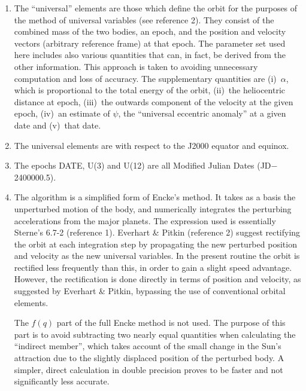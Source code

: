\documentclass[11pt,twoside]{article}
\begin{document}
{
 \begin{enumerate}
  \setlength{\parskip}{\medskipamount}
  \item The ``universal'' elements are those which define the orbit for the
        purposes of the method of universal variables (see reference 2).
        They consist of the combined mass of the two bodies, an epoch,
        and the position and velocity vectors (arbitrary reference frame)
        at that epoch.  The parameter set used here includes also various
        quantities that can, in fact, be derived from the other
        information.  This approach is taken to avoiding unnecessary
        computation and loss of accuracy.  The supplementary quantities
        are (i)~$\alpha$, which is proportional to the total energy of the
        orbit, (ii)~the heliocentric distance at epoch,
        (iii)~the outwards component of the velocity at the given epoch,
        (iv)~an estimate of $\psi$, the ``universal eccentric anomaly'' at a
        given date and (v)~that date.

  \item The universal elements are with respect to the J2000 equator and
        equinox.

  \item The epochs DATE, U(3) and U(12) are all Modified Julian Dates
        (JD$-$2400000.5).

  \item The algorithm is a simplified form of Encke's method.  It takes as
        a basis the unperturbed motion of the body, and numerically
        integrates the perturbing accelerations from the major planets.
        The expression used is essentially Sterne's 6.7-2 (reference 1).
        Everhart \& Pitkin (reference 2) suggest rectifying the orbit at
        each integration step by propagating the new perturbed position
        and velocity as the new universal variables.  In the present
        routine the orbit is rectified less frequently than this, in order
        to gain a slight speed advantage.  However, the rectification is
        done directly in terms of position and velocity, as suggested by
        Everhart \& Pitkin, bypassing the use of conventional orbital
        elements.

        The $f(q)$ part of the full Encke method is not used.  The purpose
        of this part is to avoid subtracting two nearly equal quantities
        when calculating the ``indirect member'', which takes account of the
        small change in the Sun's attraction due to the slightly displaced
        position of the perturbed body.  A simpler, direct calculation in
        double precision proves to be faster and not significantly less
        accurate.


\end{enumerate}}
\end{document}
